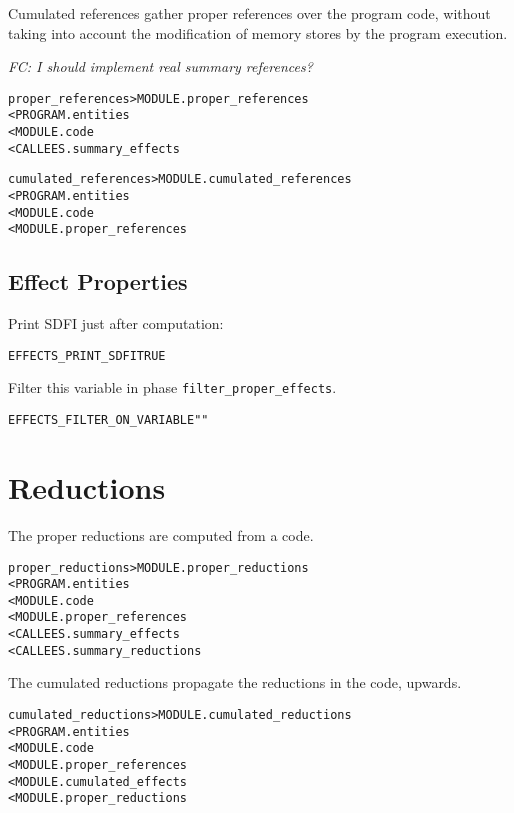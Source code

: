 \documentclass[a4paper]{report}
\newenvironment{PipsProp}{\begin{alltt}}{\end{alltt}}
\newenvironment{PipsMake}{\begin{alltt}}{\end{alltt}}
\begin{document}
Cumulated references gather proper references over the program
code, without taking into account the modification of memory stores by
the program execution. 

\emph{FC: I should implement real summary references?}

\begin{PipsMake}
proper_references       > MODULE.proper_references
        < PROGRAM.entities
        < MODULE.code
        < CALLEES.summary_effects

cumulated_references    > MODULE.cumulated_references
        < PROGRAM.entities
        < MODULE.code
        < MODULE.proper_references
\end{PipsMake}



\subsection{Effect Properties}


Print SDFI just after computation:

\begin{PipsProp}
EFFECTS_PRINT_SDFI TRUE
\end{PipsProp}

Filter this variable in phase \texttt{filter\_proper\_effects}.

\begin{PipsProp}
EFFECTS_FILTER_ON_VARIABLE ""
\end{PipsProp}


\section{Reductions}
\label{sec:reductions}

The proper reductions are computed from a code.

\begin{PipsMake}
proper_reductions > MODULE.proper_reductions
  < PROGRAM.entities
  < MODULE.code
  < MODULE.proper_references
  < CALLEES.summary_effects
  < CALLEES.summary_reductions
\end{PipsMake}

The cumulated reductions propagate the reductions in the code, upwards.

\begin{PipsMake}
cumulated_reductions > MODULE.cumulated_reductions
  < PROGRAM.entities
  < MODULE.code
  < MODULE.proper_references
  < MODULE.cumulated_effects
  < MODULE.proper_reductions
\end{PipsMake}
\end{document}
